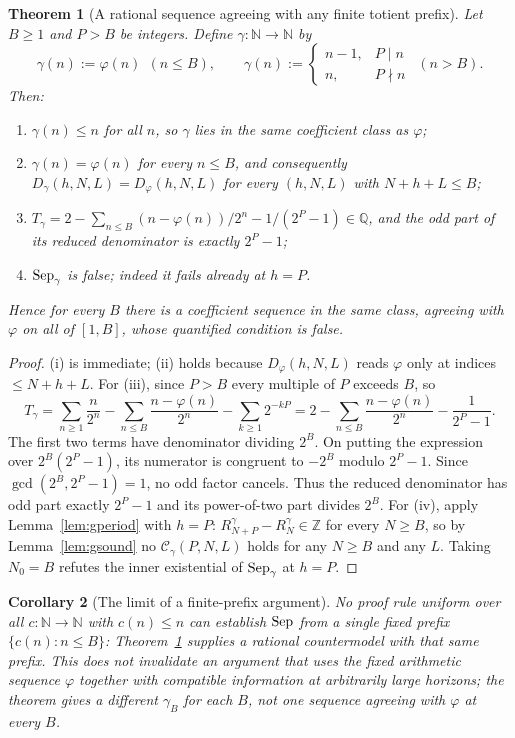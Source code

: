 \documentclass[11pt]{article}
\theoremstyle{plain}
\newtheorem{thm}{Theorem}[section]
\newtheorem{cor}[thm]{Corollary}
\theoremstyle{definition}
\theoremstyle{remark}
\let\origmathrm\mathrm
\renewcommand{\mathrm}[1]{\ifmmode\origmathrm{#1}\else\textrm{#1}\fi}%
\newcommand{\N}{\mathbb{N}}
\newcommand{\Z}{\mathbb{Z}}
\newcommand{\Q}{\mathbb{Q}}
\begin{document}
\begin{thm}[A rational sequence agreeing with any finite totient prefix]
\label{thm:gamma}
Let $B\ge1$ and $P>B$ be integers. Define $\gamma : \N \to \N$ by
\[
  \gamma(n) := \varphi(n) \ \ (n \le B), \qquad
  \gamma(n) := \begin{cases} n-1, & P \mid n \\ n, & P \nmid n \end{cases}
  \ \ (n > B).
\]
Then:
\begin{enumerate}[label=(\roman*),leftmargin=*]
\item $\gamma(n) \le n$ for all $n$, so $\gamma$ lies in the same coefficient
  class as $\varphi$;
\item $\gamma(n) = \varphi(n)$ for every $n \le B$, and consequently
  $D_\gamma(h,N,L) = D_\varphi(h,N,L)$ for every $(h,N,L)$ with
  $N + h + L \le B$;
\item $T_\gamma = 2-\sum_{n\le B}(n-\varphi(n))/2^n-1/(2^P-1)\in\Q$,
  and the odd part of its reduced denominator is \emph{exactly} $2^P-1$;
\item $\mathrm{Sep}_\gamma$ is false; indeed it fails already at $h = P$.
\end{enumerate}
Hence for every $B$ there is a coefficient sequence in the same class,
agreeing with $\varphi$ on all of $[1,B]$, whose quantified condition is false.
\end{thm}

\begin{proof}
(i) is immediate; (ii) holds because $D_\varphi(h,N,L)$ reads $\varphi$ only at
indices $\le N{+}h{+}L$. For (iii), since $P > B$ every multiple of $P$ exceeds
$B$, so
\[
  T_\gamma
  = \sum_{n\ge1}\frac{n}{2^{n}} - \sum_{n \le B}\frac{n - \varphi(n)}{2^{n}}
    - \sum_{k \ge 1} 2^{-kP}
  = 2 - \sum_{n \le B}\frac{n-\varphi(n)}{2^{n}} - \frac{1}{2^{P}-1}.
\]
The first two terms have denominator dividing $2^B$. On putting the
expression over $2^B(2^P-1)$, its numerator is congruent to $-2^B$ modulo
$2^P-1$. Since $\gcd(2^B,2^P-1)=1$, no odd factor cancels. Thus the
reduced denominator has odd part exactly $2^P-1$ and its power-of-two part
divides $2^B$. For (iv), apply Lemma~\ref{lem:gperiod} with $h=P$:
$R^{\gamma}_{N+P} - R^{\gamma}_{N} \in \Z$ for every $N \ge B$, so by
Lemma~\ref{lem:gsound} no $\mathcal C_\gamma(P,N,L)$ holds for any
$N \ge B$ and any $L$. Taking $N_0 = B$ refutes the inner existential of
$\mathrm{Sep}_\gamma$ at $h = P$.
\end{proof}

\begin{cor}[The limit of a finite-prefix argument]
\label{cor:b1}
No proof rule uniform over all $c:\N\to\N$ with $c(n)\le n$ can
establish $\mathrm{Sep}$ from a single fixed prefix
$\{c(n):n\le B\}$: Theorem~\ref{thm:gamma} supplies a rational countermodel
with that same prefix.  This does \emph{not} invalidate an argument that uses
the fixed arithmetic sequence $\varphi$ together with compatible information
at arbitrarily large horizons; the theorem gives a different $\gamma_B$ for
each $B$, not one sequence agreeing with $\varphi$ at every $B$.
\end{cor}
\end{document}

